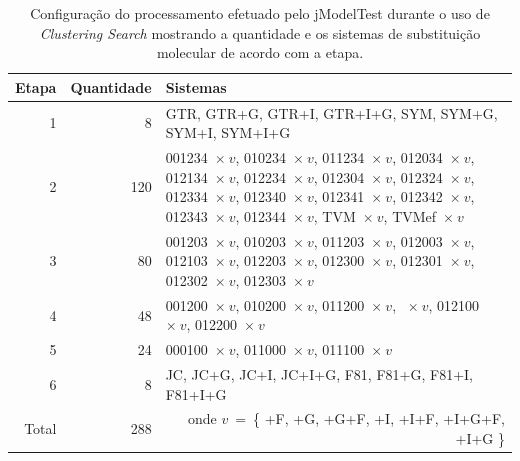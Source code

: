 \documentclass[english,brazilian]{UNISINOSmonografia} %
\newcommand\defaultFigureWidth{0.9}
\begin{document}
\begin{table}[tb]
\centering%
\begin{minipage}{\defaultFigureWidth\textwidth}
	\caption{Configuração do processamento efetuado pelo jModelTest durante o uso de \textit{Clustering Search} mostrando a quantidade e os sistemas de substituição molecular de acordo com a etapa.}
	\label{tab:modelo-elasticidade-jmodelsteps}
	\small
	\vspace{1ex}
	\renewcommand {\tabularxcolumn}[1]{>{\arraybackslash}m{#1}} %
	\begin{tabularx}{\textwidth}{rrX@{}}
		\toprule
		Etapa & Quantidade & {Sistemas} \\ 
		\midrule
		1 & 8 &  GTR, GTR+G, GTR+I, GTR+I+G, \newline SYM, SYM+G, SYM+I, SYM+I+G  \\
		2 & 120 &  001234~$\times~v$, 010234~$\times~v$, 011234~$\times~v$, 012034~$\times~v$, 012134~$\times~v$, 012234~$\times~v$, 012304~$\times~v$, 012324~$\times~v$, 012334~$\times~v$, 012340~$\times~v$, 012341~$\times~v$, 012342~$\times~v$, 012343~$\times~v$, 012344~$\times~v$, \newline TVM~$\times~v$, TVMef~$\times~v$  \\
		3 & 80 &  001203~$\times~v$, 010203~$\times~v$, 011203~$\times~v$, 012003~$\times~v$, 012103~$\times~v$, 012203~$\times~v$, 012300~$\times~v$, 012301~$\times~v$, 012302~$\times~v$, 012303~$\times~v$  \\
		4 & 48 &  001200~$\times~v$, 010200~$\times~v$, 011200~$\times~v$, \newline 012000~$\times~v$, 012100~$\times~v$, 012200~$\times~v$  \\
		5 & 24 &  000100~$\times~v$, 011000~$\times~v$, 011100~$\times~v$  \\
		6 & 8 &  JC, JC+G, JC+I, JC+I+G, \newline F81, F81+G, F81+I, F81+I+G  \\
		\bottomrule
		Total & 288 & \multicolumn{1}{r}{onde $ v~=~${\small \{ +F, +G, +G+F, +I, +I+F, +I+G+F, +I+G \}}} \\ 
	\end{tabularx}
\end{minipage}
\end{table}
\end{document}
